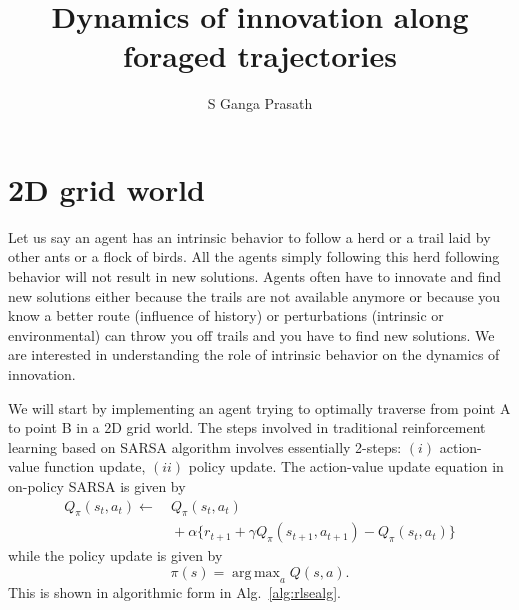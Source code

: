 \documentclass[12pt]{article}
\DeclareMathOperator*{\argmax}{arg\,max}
\begin{document}
\title{Dynamics of innovation along foraged trajectories}
\author{S Ganga Prasath}
\date{}


\maketitle
\section{2D grid world}
Let us say an agent has an intrinsic behavior to follow a herd or a trail
laid by other ants or a flock of birds. All the agents simply following this
herd following behavior will not result in new solutions. Agents often have
to innovate and find new solutions either because the trails are not available
anymore or because you know a better route (influence of history) or perturbations
(intrinsic or environmental) can throw you off trails and you have to find new solutions.
We are interested in understanding the role of intrinsic behavior on the dynamics of innovation.

We will start by implementing an agent trying to optimally traverse from point
A to point B in a 2D grid world. The steps involved in traditional reinforcement
learning based on SARSA algorithm involves essentially 2-steps: $(i)$ action-value
function update, $(ii)$ policy update. The action-value update equation in on-policy SARSA is given by
\begin{align}
Q_\pi(s_t, a_t) \leftarrow & \ Q_\pi(s_t, a_t) \nonumber \\
& \ + \alpha \{ r_{t+1} + \gamma Q_\pi(s_{t+1}, a_{t+1}) - Q_\pi(s_t, a_t) \}
\end{align}
while the policy update is given by
\[
\pi(s) = \argmax_a Q(s, a).
\]
This is shown in algorithmic form in Alg.~\ref{alg:rlsealg}. \\[5pt]
\end{document}
